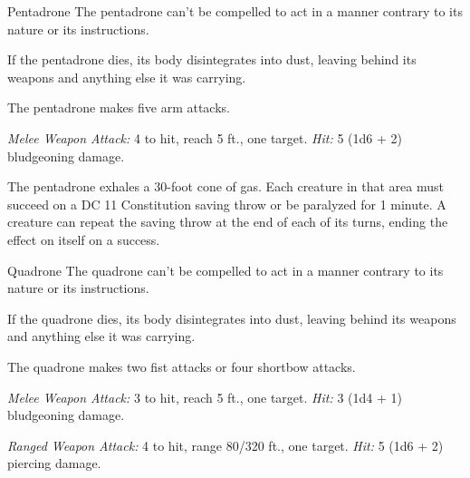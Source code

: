 \documentclass[10pt,a4paper,twoside,bg=print,twocolumn,openany,nodeprecatedcode]{dndarticle}
\begin{document}
\begin{DndMonster}[float=t]{Pentadrone}
\DndMonsterBasics[
armor-class = {16 (natural armor)},
hit-points = {\DndDice{5d10 + 5}},
speed = {40 ft.}
]
\DndMonsterAbilityScores[
 str = 15,
 dex = 14,
 con = 12,
 int = 10,
 wis = 10,
 cha = 13
]
\DndMonsterDetails[
skills = {Perception +4},
senses = {truesight 120 ft., passive perception 14},
languages = {Modron},
challenge = 2,
]
The pentadrone can't be compelled to act in a manner contrary to its nature or its instructions.

If the pentadrone dies, its body disintegrates into dust, leaving behind its weapons and anything else it was carrying.

The pentadrone makes five arm attacks.

\textsl{Melee Weapon Attack:} 4 to hit, reach 5 ft., one target. \textsl{Hit:} 5 (1d6 + 2) bludgeoning damage.

The pentadrone exhales a 30-foot cone of gas. Each creature in that area must succeed on a DC 11 Constitution saving throw or be paralyzed for 1 minute. A creature can repeat the saving throw at the end of each of its turns, ending the effect on itself on a success.

\end{DndMonster}



\begin{DndMonster}[float=t]{Quadrone}
\DndMonsterBasics[
armor-class = {16 (natural armor)},
hit-points = {\DndDice{4d8 + 4}},
speed = {30 ft., fly 30 ft.}
]
\DndMonsterAbilityScores[
 str = 12,
 dex = 14,
 con = 12,
 int = 10,
 wis = 10,
 cha = 11
]
\DndMonsterDetails[
skills = {Perception +2},
senses = {truesight 120 ft., passive perception 12},
languages = {Modron},
challenge = 1,
]
The quadrone can't be compelled to act in a manner contrary to its nature or its instructions.

If the quadrone dies, its body disintegrates into dust, leaving behind its weapons and anything else it was carrying.

The quadrone makes two fist attacks or four shortbow attacks.

\textsl{Melee Weapon Attack:} 3 to hit, reach 5 ft., one target. \textsl{Hit:} 3 (1d4 + 1) bludgeoning damage.

\textsl{Ranged Weapon Attack:} 4 to hit, range 80/320 ft., one target. \textsl{Hit:} 5 (1d6 + 2) piercing damage.

\end{DndMonster}
\end{document}
